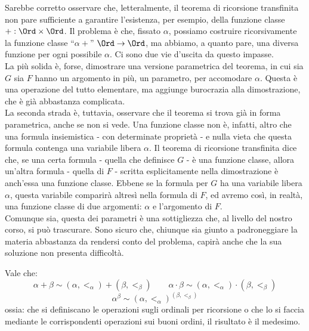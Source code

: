 \documentclass[11pt]{scrartcl}
\begin{document}
\begin{notation}
	Sarebbe corretto osservare che, letteralmente, il teorema di ricorsione transfinita non pare sufficiente a garantire l'esistenza, per esempio, della funzione classe $+ : \Ord \times \Ord$.
	Il problema è che, fissato $\alpha$, possiamo costruire ricorsivamente la funzione classe ``$\alpha +$'' $\Ord \rightarrow \Ord$, ma abbiamo, a quanto pare, una diversa funzione per ogni possibile $\alpha$.
	Ci sono due vie d'uscita da questo impasse.\\
	La più solida è, forse, dimostrare una versione parametrica del teorema, in cui sia $G$ sia $F$ hanno un argomento in più, un parametro, per accomodare $\alpha$.
	Questa è una operazione del tutto elementare, ma aggiunge burocrazia alla dimostrazione, che è già abbastanza complicata.\\
	La seconda strada è, tuttavia, osservare che il teorema si trova già in forma parametrica, anche se non si vede. Una funzione classe non è, infatti, altro che una formula insiemistica - con determinate proprietà - e nulla vieta 
	che questa formula contenga una variabile libera $\alpha$. Il teorema di ricorsione transfinita dice che, se una certa formula - quella che definisce $G$ - è una funzione classe, allora un'altra formula - quella di $F$ - scritta esplicitamente nella 
	dimostrazione è anch'essa una funzione classe. Ebbene se la formula per $G$ ha una variabile libera $\alpha$, questa variabile comparirà altresì nella formula di $F$, ed avremo così, in realtà, una funzione classe di due argomenti: $\alpha$ e l'argomento di $F$.\\
	Comunque sia, questa dei parametri è una sottigliezza che, al livello del nostro corso, si può trascurare. Sono sicuro che, chiunque sia giunto a padroneggiare la materia abbastanza da rendersi conto del problema, capirà anche che la sua soluzione 
	non presenta difficoltà.
\end{notation}

\begin{proposition}
	Vale che:
	\[ \alpha + \beta \sim (\alpha,<_\alpha) + (\beta,<_\beta) \qquad \alpha \cdot \beta \sim (\alpha,<_\alpha) \cdot (\beta,<_\beta) 
		\]\[ \alpha^\beta \sim (\alpha,<_\alpha)^{(\beta,<_\beta) }
			\]
	ossia: che si definiscano le operazioni sugli ordinali per ricorsione o che lo si faccia mediante le corrispondenti operazioni sui buoni ordini, il risultato è il medesimo.
\end{proposition}
\end{document}
